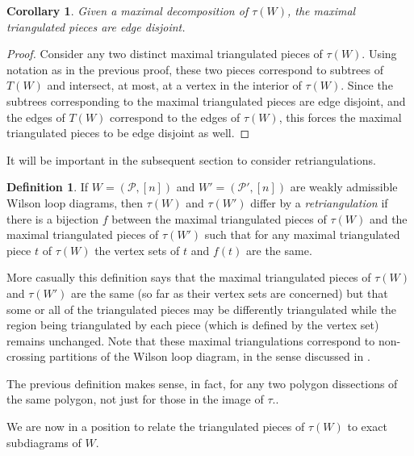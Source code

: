 \documentclass[11pt]{article}
\newcommand{\cP}{\mathcal{P}}
\newtheorem{cor}[thm]{Corollary}
\theoremstyle{remark}
\theoremstyle{definition}
\newtheorem{dfn}[thm]{Definition}
\begin{document}
\begin{cor} \label{maxtriangdisjointcor}
Given a maximal decomposition of $\tau(W)$, the maximal triangulated pieces are edge disjoint.
\end{cor}

\begin{proof}
Consider any two distinct maximal triangulated pieces of $\tau(W)$. Using notation as in the previous proof, these two pieces correspond to subtrees of $T(W)$ and intersect, at most, at a vertex in the interior of $\tau(W)$. Since the subtrees corresponding to the maximal triangulated pieces are edge disjoint, and the edges of $T(W)$ correspond to the edges of $\tau(W)$, this forces the maximal triangulated pieces to be edge disjoint as well.
\end{proof}

It will be important in the subsequent section to consider retriangulations.
\begin{dfn} \label{retriangulation}
  If $W = (\cP, [n])$ and $W' = (\cP', [n])$ are weakly admissible Wilson loop diagrams, then $\tau(W)$ and $\tau(W')$  differ by a \emph{retriangulation} if there is a bijection $f$ between the maximal triangulated pieces of $\tau(W)$ and the maximal triangulated pieces of $\tau(W')$ such that for any maximal triangulated piece $t$ of $\tau(W)$ the vertex sets of $t$ and $f(t)$ are the same.
\end{dfn}
More casually this definition says that the maximal triangulated pieces of $\tau(W)$ and $\tau(W')$ are the same (so far as their vertex sets are concerned) but that some or all of the triangulated pieces may be differently triangulated while the region being triangulated by each piece (which is defined by the vertex set) remains unchanged. Note that these maximal triangulations correspond to non-crossing partitions of the Wilson loop diagram, in the sense discussed in \cite{positroids13}. 

The previous definition makes sense, in fact, for any two polygon dissections of the same polygon, not just for those in the image of $\tau$..

\medskip
  
We are now in a position to relate the triangulated pieces of $\tau(W)$ to exact subdiagrams of $W$.
\end{document}
